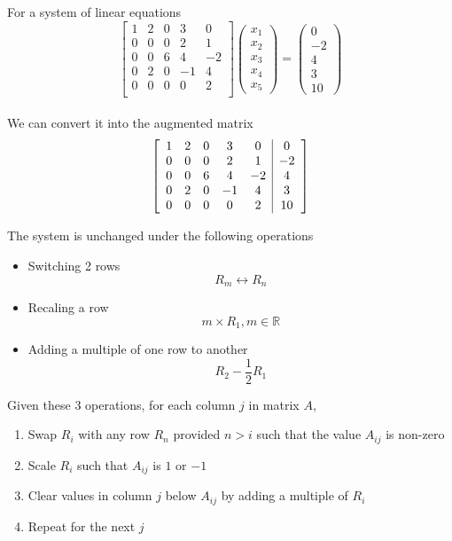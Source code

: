 \begin{framed}
   For a system of linear equations \[
      \begin{bmatrix} 
            1 & 2 & 0 & 3 & 0\\
            0 & 0 & 0 & 2 & 1\\
            0 & 0 & 6 & 4 & -2\\
            0 & 2 & 0 & -1 & 4\\
            0 & 0 & 0 & 0 & 2\\
      \end{bmatrix} 
      \begin{pmatrix} x_1 \\ x_2 \\ x_3 \\ x_4 \\ x_5 \end{pmatrix} = \begin{pmatrix} 
       0 \\ -2 \\ 4 \\ 3 \\ 10
    \end{pmatrix} 
   \] 
   \\

   We can convert it into the augmented matrix 
   \[ 
      \left[ 
         \begin{array}{c c c c c | c}
            1 & 2 & 0 & 3 & 0 & 0 \\
            0 & 0 & 0 & 2 & 1 & -2 \\
            0 & 0 & 6 & 4 & -2 & 4 \\
            0 & 2 & 0 & -1 & 4 & 3 \\
            0 & 0 & 0 & 0 & 2 & 10 \\
        \end{array}
      \right] 
   \] 

   The system is unchanged under the following operations
   \begin{itemize}
      \item Switching 2 rows \[
        R_m \leftrightarrow R_n
      \] 

      \item Recaling a row \[
         m \times R_1, m \in \mathbb{R}
      \] 

      \item Adding a multiple of one row to another \[
            R_2 - \frac{1}{2}R_1
      \] 
   \end{itemize}

   Given these 3 operations, for each column $j$ in matrix $A$, 
   \begin{enumerate}
      \item Swap  $R_i$ with any row $R_n$ provided $n > i$ such that the value  $A_{ij}$ is non-zero
      \item Scale $R_i$ such that $A_{ij}$ is $1$ or $-1$
      \item Clear values in column $j$ below $A_{ij}$ by adding a multiple of $R_i$
      \item Repeat for the next $j$
   \end{enumerate}
\end{framed}


